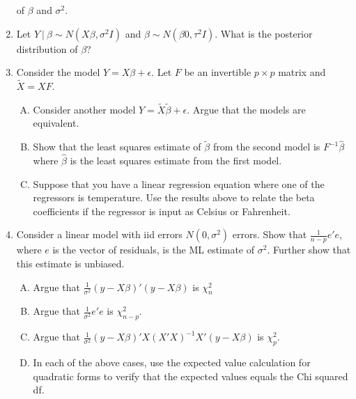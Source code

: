\documentclass[12pt]{article}
\begin{document}
\begin{enumerate}[1.]
  of $\beta$ and $\sigma^2$.
\item Let $Y ~|~ \beta \sim N(X\beta, \sigma^2 I)$ and $\beta \sim N(\beta0, \tau^2 I)$. What is the posterior distribution of $\beta$?
\item Consider the model $Y = X\beta + \epsilon$. Let $F$ be an invertible $p\times p$ matrix and $\tilde X = X F$. 
\begin{enumerate}[A.]
	\item Consider another model $Y = \tilde X \tilde \beta + \epsilon$. Argue that the models are equivalent.
	\item Show that the least squares estimate of $\tilde \beta$ from the second model is $F^{-1} \hat \beta$ where $\hat \beta$ is the least squares
	estimate from the first model.
	\item Suppose that you have a linear regression equation where one of the regressors is temperature. Use the results above to relate the
		beta coefficients if the regressor is input as Celsius or Fahrenheit.
\end{enumerate}
\item Consider a linear model with iid errors $N(0, \sigma^2)$ errors. Show that $\frac{1}{n-p} e'e$, where $e$ is the vector of residuals, is the
	ML estimate of $\sigma^2$. Further show that this estimate is unbiased.
\begin{enumerate}[A.]
	\item Argue that $\frac{1}{\sigma^2} (y - X\beta)' (y - X\beta)$ is $\chi^2_n$
	\item Argue that $\frac{1}{\sigma^2} e'e$ is $\chi^2_{n-p}$.
	\item Argue that $\frac{1}{\sigma^2} (y - X \beta)' X(X'X)^{-1} X' (y - X\beta)$ is $\chi^2_p$.
	\item In each of the above cases, use the expected value calculation for quadratic forms to verify that the expected values equals the Chi squared df.
\end{enumerate}
\end{enumerate}
\end{document}
